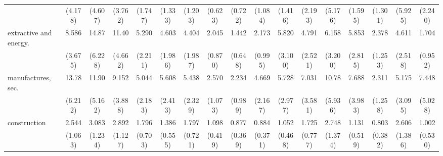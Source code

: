 {\begin{tabular}{l*{16}{c}}
                    &     (4.178)         &     (4.607)         &     (3.762)         &     (1.747)         &     (1.333)         &     (1.203)         &     (0.623)         &     (0.722)         &     (1.084)         &     (1.416)         &     (2.193)         &     (5.176)         &     (1.595)         &     (1.301)         &     (5.925)         &     (2.240)         \\
[1em]
extractive and energy.&       8.586\sym{***}&       14.87\sym{***}&       11.40\sym{***}&       5.290\sym{***}&       4.603\sym{***}&       4.404\sym{**} &       2.045         &       1.442         &       2.173         &       5.820\sym{***}&       4.791\sym{**} &       6.158\sym{***}&       5.853\sym{***}&       2.378         &       4.611\sym{**} &       1.704         \\
                    &     (3.675)         &     (6.228)         &     (4.662)         &     (2.211)         &     (1.986)         &     (1.987)         &     (0.870)         &     (0.648)         &     (0.995)         &     (3.100)         &     (2.521)         &     (3.200)         &     (2.815)         &     (1.253)         &     (2.518)         &     (0.952)         \\
[1em]
manufactures, sec.  &       13.78\sym{***}&       11.90\sym{***}&       9.152\sym{***}&       5.044\sym{***}&       5.608\sym{***}&       5.438\sym{***}&       2.570\sym{*}  &       2.234         &       4.669\sym{***}&       5.728\sym{***}&       7.031\sym{***}&       10.78\sym{***}&       7.688\sym{***}&       2.311         &       5.175\sym{**} &       7.448\sym{**} \\
                    &     (6.212)         &     (5.162)         &     (3.888)         &     (2.183)         &     (2.413)         &     (2.329)         &     (1.073)         &     (0.989)         &     (2.167)         &     (2.977)         &     (3.581)         &     (5.936)         &     (3.983)         &     (1.258)         &     (3.095)         &     (5.028)         \\
[1em]
construction        &       2.544\sym{*}  &       3.083\sym{**} &       2.892\sym{**} &       1.796         &       1.386         &       1.797         &       1.098         &       0.877         &       0.884         &       1.052         &       1.725         &       2.748\sym{*}  &       1.131         &       0.803         &       2.606         &       1.002         \\
                    &     (1.063)         &     (1.234)         &     (1.127)         &     (0.703)         &     (0.555)         &     (0.721)         &     (0.419)         &     (0.369)         &     (0.371)         &     (0.468)         &     (0.777)         &     (1.374)         &     (0.519)         &     (0.382)         &     (1.386)         &     (0.530)         \\

\end{tabular}}
